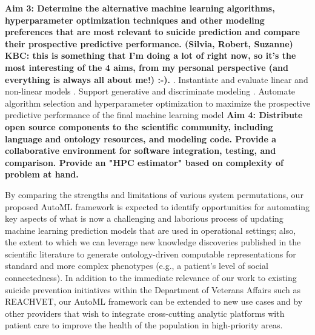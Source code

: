 \textbf{Aim 3: Determine the alternative machine learning algorithms, hyperparameter optimization techniques and other modeling preferences that are most relevant to suicide prediction and compare their prospective predictive performance. (Silvia, Robert, Suzanne) KBC: this is something that I'm doing a lot of right now, so it's the most interesting of the 4 aims, from my personal perspective (and everything is always all about me!) :-).}
. Instantiate and evaluate linear and non-linear models
. Support generative and discriminate modeling
. Automate algorithm selection and hyperparameter optimization to maximize the prospective predictive performance of the final machine learning model
\newline
\textbf{Aim 4: Distribute open source components to the scientific community, including language and ontology resources, and modeling code. Provide a collaborative environment for software integration, testing, and comparison. Provide an "HPC estimator" based on complexity of problem at hand.}
\newline

By comparing the strengths and limitations of various system permutations, our proposed AutoML framework is expected to identify opportunities for automating key aspects of what is now a challenging and laborious process of updating machine learning prediction models that are used in operational settings; also, the extent to which we can leverage new knowledge discoveries published in the scientific literature to generate ontology-driven computable representations for standard and more complex phenotypes (e.g., a patient's level of social connectedness).  In addition to the immediate relevance of our work to existing suicide prevention initiatives within the Department of Veterans Affairs such as REACHVET, our AutoML framework can be extended to new use cases and by other providers that wish to integrate cross-cutting analytic platforms with patient care to improve the health of the population in high-priority areas.



